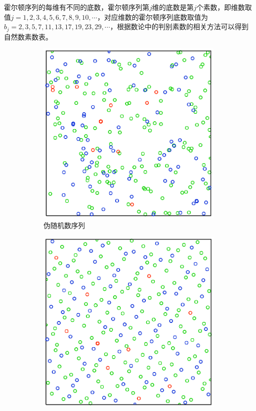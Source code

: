 霍尔顿序列的每维有不同的底数，霍尔顿序列第$j$维的底数是第$j$个素数，即维数取值$j=1,2,3,4,5,6,7,8,9,10,\cdots$，对应维数的霍尔顿序列底数取值为$b_j=2,3,5,7,11,13,17,19,23,29,\cdots$，根据数论中的判别素数的相关方法可以得到自然数素数表。

\begin{figure}
\sidecaption
	{\begin{subfigure}[b]{0.32\textwidth}
		\includegraphics[width=1.\textwidth]{figures/mc/halton-1}
		\caption{伪随机数序列}
	\end{subfigure}
	\begin{subfigure}[b]{0.32\textwidth}
		\includegraphics[width=1.\textwidth]{figures/mc/halton-2}

\end{subfigure}}
\end{figure}
